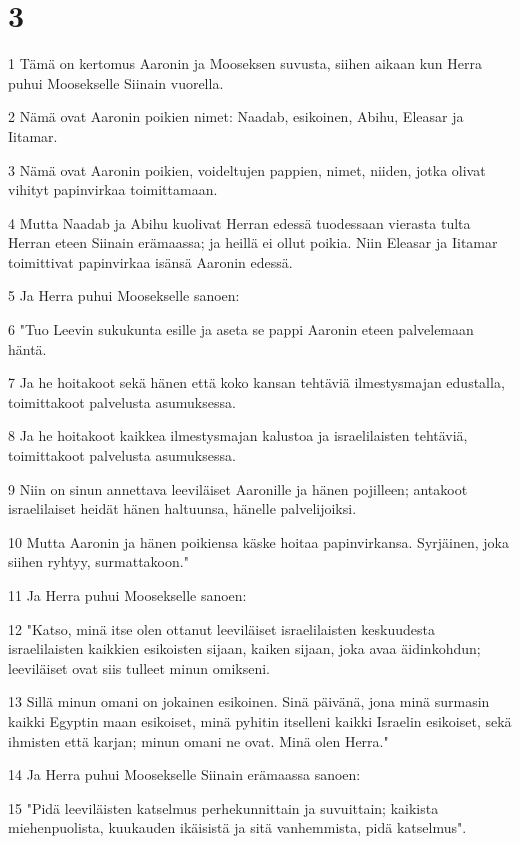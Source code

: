 \chapter{3}

\par 1 Tämä on kertomus Aaronin ja Mooseksen suvusta, siihen aikaan kun Herra puhui Moosekselle Siinain vuorella.
\par 2 Nämä ovat Aaronin poikien nimet: Naadab, esikoinen, Abihu, Eleasar ja Iitamar.
\par 3 Nämä ovat Aaronin poikien, voideltujen pappien, nimet, niiden, jotka olivat vihityt papinvirkaa toimittamaan.
\par 4 Mutta Naadab ja Abihu kuolivat Herran edessä tuodessaan vierasta tulta Herran eteen Siinain erämaassa; ja heillä ei ollut poikia. Niin Eleasar ja Iitamar toimittivat papinvirkaa isänsä Aaronin edessä.
\par 5 Ja Herra puhui Moosekselle sanoen:
\par 6 "Tuo Leevin sukukunta esille ja aseta se pappi Aaronin eteen palvelemaan häntä.
\par 7 Ja he hoitakoot sekä hänen että koko kansan tehtäviä ilmestysmajan edustalla, toimittakoot palvelusta asumuksessa.
\par 8 Ja he hoitakoot kaikkea ilmestysmajan kalustoa ja israelilaisten tehtäviä, toimittakoot palvelusta asumuksessa.
\par 9 Niin on sinun annettava leeviläiset Aaronille ja hänen pojilleen; antakoot israelilaiset heidät hänen haltuunsa, hänelle palvelijoiksi.
\par 10 Mutta Aaronin ja hänen poikiensa käske hoitaa papinvirkansa. Syrjäinen, joka siihen ryhtyy, surmattakoon."
\par 11 Ja Herra puhui Moosekselle sanoen:
\par 12 "Katso, minä itse olen ottanut leeviläiset israelilaisten keskuudesta israelilaisten kaikkien esikoisten sijaan, kaiken sijaan, joka avaa äidinkohdun; leeviläiset ovat siis tulleet minun omikseni.
\par 13 Sillä minun omani on jokainen esikoinen. Sinä päivänä, jona minä surmasin kaikki Egyptin maan esikoiset, minä pyhitin itselleni kaikki Israelin esikoiset, sekä ihmisten että karjan; minun omani ne ovat. Minä olen Herra."
\par 14 Ja Herra puhui Moosekselle Siinain erämaassa sanoen:
\par 15 "Pidä leeviläisten katselmus perhekunnittain ja suvuittain; kaikista miehenpuolista, kuukauden ikäisistä ja sitä vanhemmista, pidä katselmus".
